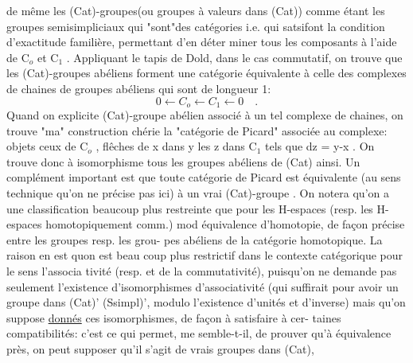 
de même les (Cat)-groupes(ou groupes à valeurs dans (Cat)) comme étant
les groupes semisimpliciaux qui "sont"des catégories i.e. qui 
 satsifont la condition d'exactitude familière, permettant d'en déter
miner tous les composants à l'aide de C$_{o}$ et C$_{1}$ . Appliquant le tapis de
Dold, dans le cas commutatif, on trouve que les (Cat)-groupes abéliens
forment une catégorie équivalente à celle des complexes de chaines de
groupes abéliens qui sont de longueur 1:
\[ 0 \leftarrow C_{o} \leftarrow C_{1} \leftarrow 0 \quad . \]
Quand on explicite  (Cat)-groupe abélien associé à un tel complexe de
chaines, on trouve "ma" construction chérie  la "catégorie de Picard"
associée au complexe: objets ceux de C$_{o}$ , flêches de x dans y les z dans C$_{1}$
tels que dz = y-x . On trouve donc à isomorphisme  tous les groupes
abéliens de (Cat) ainsi. Un complément important est que toute catégorie
de Picard est équivalente (au sens technique qu'on ne précise
pas ici) à  un vrai (Cat)-groupe  . 
On notera qu'on a une  classification beaucoup plus restreinte
que pour les H-espaces (resp. les H-espaces homotopiquement comm.) mod
équivalence d'homotopie, de façon précise entre les groupes resp. les grou-%
pes abéliens de la catégorie homotopique. La raison en est quon est beau
\margin{//} coup plus restrictif dans le contexte catégorique pour le sens  l'associa
tivité (resp. et de la commutativité), puisqu'on ne demande pas seulement \margin{//}
l'existence d'isomorphismes d'associativité\xout{,} (qui suffirait pour avoir un
groupe dans \hand{$\gamma$}(Cat)' \hand{$\simeq$} (Ssimpl)', modulo l'existence d'unités et d'inverse)
mais qu'on suppose \uline{donnés} ces isomorphismes, de façon à satisfaire à cer-%
taines compatibilités: c'est ce qui permet, me semble-t-il, de prouver qu'à
\margin{//} \margin{(} équivalence près, on peut supposer qu'il s'agit de vrais groupes dans
(Cat), 

